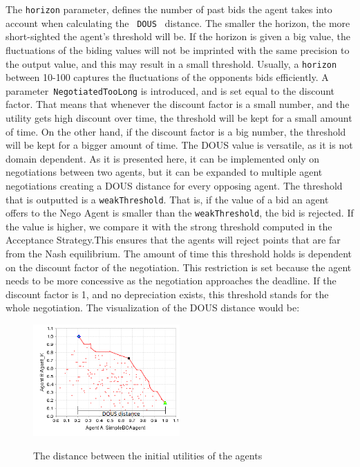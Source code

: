\documentclass[html]{report}    %
\begin{document}
The \texttt{horizon} parameter, defines the number of past bids the agent takes into account when calculating the ~\texttt{DOUS}~\cite{anac2013} distance. The smaller the horizon, the more short-sighted the agent's threshold will be. If the horizon is given a big value, the fluctuations of the biding values will not be imprinted with the same precision to the output value, and this may result in a small threshold. Usually, a \texttt{horizon} between 10-100 captures the fluctuations of the opponents bids efficiently.
A parameter~\texttt{NegotiatedTooLong} is introduced, and is set equal to the discount factor. That means that whenever the discount factor is a small number, and the utility gets high discount over time, the threshold will be kept for a small amount of time. On the other hand, if the discount factor is a big number, the threshold will be kept for a bigger amount of time.
The DOUS value is versatile, as it is not domain dependent.
As it is presented here, it can be implemented only on negotiations between two agents, but it can be expanded to multiple agent negotiations creating a DOUS distance for every opposing agent. The threshold that is outputted is a \texttt{weakThreshold}. That is, if the value of a bid an agent offers to the Nego Agent is smaller than the \texttt{weakThreshold}, the bid is rejected. If the value is higher, we compare it with the strong threshold computed in the Acceptance Strategy.This ensures that the agents will reject points that are far from the Nash equilibrium.
The amount of time this threshold holds is dependent on the discount factor of the negotiation. This restriction is set because the agent needs to be more concessive as the negotiation approaches the deadline. If the discount factor is 1, and no depreciation exists, this threshold stands for the whole negotiation. 
The visualization of the DOUS distance would be:

\begin{figure}[htbp]
  \caption{The distance between the initial utilities of the agents}
  \centering
    \includegraphics[width=0.5\textwidth]{dous}
    \label{3}
\end{figure}
\end{document}
